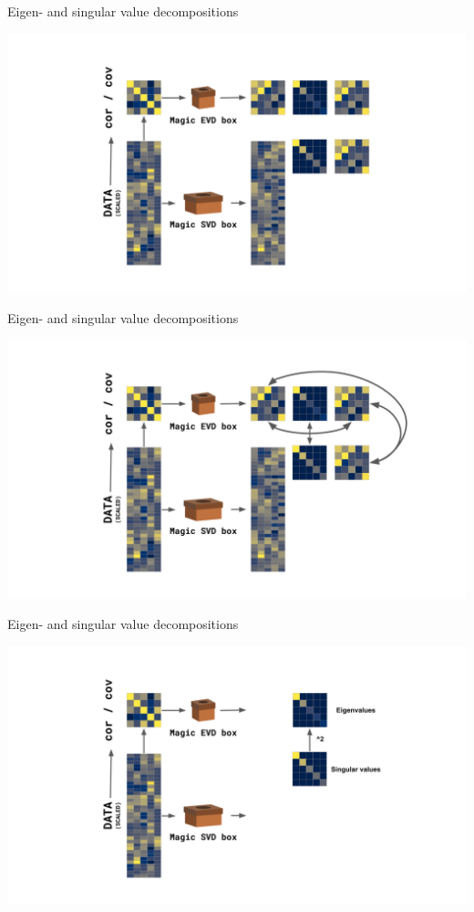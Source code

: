 \documentclass[
  ignorenonframetext,
]{beamer}
\begin{document}
\begin{frame}{Eigen- and singular value decompositions}
\protect\hypertarget{eigen--and-singular-value-decompositions}{}

\includegraphics{../images/EVD_SVD_1.png}

\end{frame}

\begin{frame}{Eigen- and singular value decompositions}
\protect\hypertarget{eigen--and-singular-value-decompositions-1}{}

\includegraphics{../images/EVD_SVD_2.png}

\end{frame}

\begin{frame}{Eigen- and singular value decompositions}
\protect\hypertarget{eigen--and-singular-value-decompositions-2}{}

\includegraphics{../images/EVD_SVD_3.png}

\end{frame}
\end{document}
